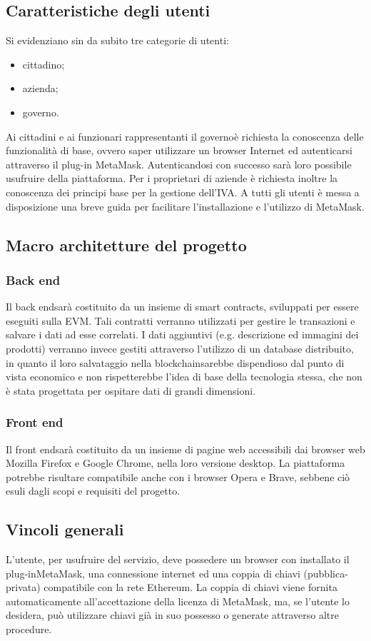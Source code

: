 \subsection{Caratteristiche degli utenti}
Si evidenziano sin da subito tre categorie di utenti:
\begin{itemize}
	\item cittadino;
	\item azienda;
	\item governo\glo.
\end{itemize}
Ai cittadini e ai funzionari rappresentanti il governo\glosp è richiesta la conoscenza delle funzionalità di base, ovvero saper utilizzare un browser Internet ed autenticarsi attraverso il plug-in MetaMask\glo. Autenticandosi con successo sarà loro possibile usufruire della piattaforma. Per i proprietari di aziende è richiesta inoltre la conoscenza dei principi base per la gestione dell'IVA. A tutti gli utenti è messa a disposizione una breve guida per facilitare l'installazione e l'utilizzo di MetaMask\glo. 

\subsection{Macro architetture del progetto}
\subsubsection{Back end}
Il back end\glosp sarà costituito da un insieme di smart contracts\glo, sviluppati per essere eseguiti sulla EVM\glo. Tali contratti verranno utilizzati per gestire le transazioni e salvare i dati ad esse correlati. I dati aggiuntivi (e.g. descrizione ed immagini dei prodotti) verranno invece gestiti attraverso l'utilizzo di un database distribuito, in quanto il loro salvataggio nella blockchain\glosp sarebbe dispendioso dal punto di vista economico e non rispetterebbe l'idea di base della tecnologia stessa, che non è stata progettata per ospitare dati di grandi dimensioni.

\subsubsection{Front end}
Il front end\glosp sarà costituito da un insieme di pagine web accessibili dai browser web Mozilla Firefox e Google Chrome, nella loro versione desktop. La piattaforma potrebbe risultare compatibile anche con i browser Opera e Brave, sebbene ciò esuli dagli scopi e requisiti del progetto.

\subsection{Vincoli generali}
L’utente, per usufruire del servizio, deve possedere un browser con installato il plug-in\glosp MetaMask\glo, una connessione internet ed una coppia di chiavi (pubblica-privata) compatibile con la rete Ethereum\glo. La coppia di chiavi viene fornita automaticamente all'accettazione della licenza di MetaMask\glo, ma, se l’utente lo desidera, può utilizzare chiavi già in suo possesso o generate attraverso altre procedure.

 

